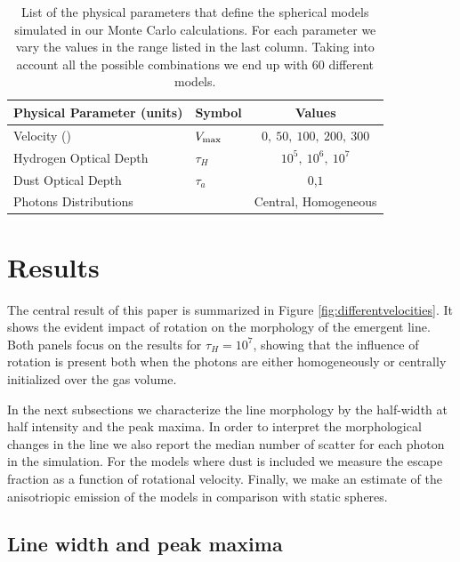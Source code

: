 \documentclass{emulateapj}
\newcommand{\ly}{{\ifmmode{{\rm Ly}\alpha~}\else{Ly$\alpha$~}\fi}}
\newcommand{\kms}{{\ifmmode{{\mathrm{\,km\ s}^{-1}}}\else{\,km~s$^{-1}$}\fi}}
\begin{document}
\begin{table}
\begin{center}
\begin{tabular}{llc}\hline\hline
Physical Parameter (units) & Symbol & Values\\\hline
Velocity (\kms) & $V_{\rm max}$&$0,\ 50,\ 100,\ 200,\ 300$\\
Hydrogen Optical Depth & $\tau_{H} $ & $10^{5},\ 10^{6},\ 10^{7}$\\
Dust Optical Depth & $\tau_{a}$ & $0$,$1$\\
Photons Distributions & & Central, Homogeneous\\\hline\hline
\end{tabular}
\caption{
  List of the physical parameters that define the spherical models 
  simulated in our Monte Carlo calculations. For each parameter we
  vary the values in the range listed in the last column. Taking into
  account all the possible combinations we end up with $60$ different
  models.} 
\label{table:models}
\end{center}
\end{table}


\section{Results}
\label{sec:results}

The central result of this paper is summarized in Figure
\ref{fig:differentvelocities}. It shows the evident
impact of rotation on the morphology of the emergent \ly line. Both
panels focus on the results for $\tau_{H}=10^{7}$, showing that the
influence of rotation is present both when the photons are either
homogeneously or centrally initialized over the gas volume.  

In the next subsections we characterize the line morphology by
the half-width at half intensity and the peak maxima. In order to
interpret the morphological changes in the line we also report the
median number of scatter for each \ly photon in the
simulation. For the models where dust is included we measure the 
escape fraction as a function of rotational velocity. Finally, we make
an estimate of the anisotriopic emission of the models in comparison
with static spheres.


\subsection{Line width and peak maxima}
\label{sec:widthpeak}
\end{document}
